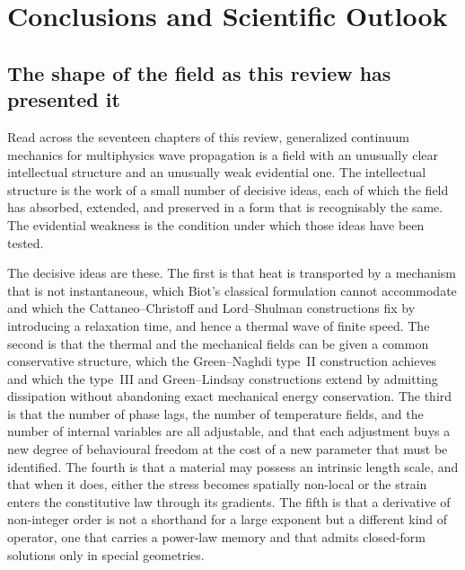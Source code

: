 \section{Conclusions and Scientific Outlook}
\label{sec:conclusions}

\subsection{The shape of the field as this review has presented it}
\label{sec:17.1}

Read across the seventeen chapters of this review, generalized continuum mechanics for multiphysics wave propagation is a field with an unusually clear intellectual structure and an unusually weak evidential one. The intellectual structure is the work of a small number of decisive ideas, each of which the field has absorbed, extended, and preserved in a form that is recognisably the same. The evidential weakness is the condition under which those ideas have been tested.

The decisive ideas are these. The first is that heat is transported by a mechanism that is not instantaneous, which Biot's classical formulation cannot accommodate and which the Cattaneo--Christoff and Lord--Shulman constructions fix by introducing a relaxation time, and hence a thermal wave of finite speed. The second is that the thermal and the mechanical fields can be given a common conservative structure, which the Green--Naghdi type~II construction achieves and which the type~III and Green--Lindsay constructions extend by admitting dissipation without abandoning exact mechanical energy conservation. The third is that the number of phase lags, the number of temperature fields, and the number of internal variables are all adjustable, and that each adjustment buys a new degree of behavioural freedom at the cost of a new parameter that must be identified. The fourth is that a material may possess an intrinsic length scale, and that when it does, either the stress becomes spatially non-local or the strain enters the constitutive law through its gradients. The fifth is that a derivative of non-integer order is not a shorthand for a large exponent but a different kind of operator, one that carries a power-law memory and that admits closed-form solutions only in special geometries.

